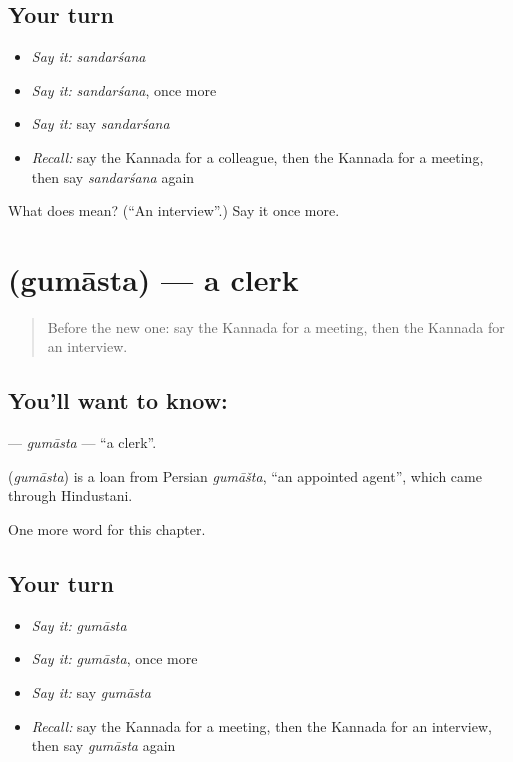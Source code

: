 \subsection*{Your turn}
\begin{itemize}
\raggedright
  \item \emph{Say it:} \emph{sandarśana}
  \item \emph{Say it:} \emph{sandarśana}, once more
  \item \emph{Say it:} say \emph{sandarśana}
  \item \emph{Recall:} say the Kannada for a colleague, then the Kannada for a meeting, then say \emph{sandarśana} again
\end{itemize}

\begin{tcolorbox}[breakable,colback=teal!4,colframe=teal!35!black,title={Before you move on}]
What does  mean? (\textquotedblleft{}An interview\textquotedblright{}.) Say it once more.
\end{tcolorbox}
\section[\texorpdfstring{\kn{ಗುಮಾಸ್ತ} (gumāsta)}{ಗುಮಾಸ್ತ (gumāsta)}]{ (gumāsta) — a clerk}

\label{lesson:KA-C231-gumasta}



\begin{quote}
Before the new one: say the Kannada for a meeting, then the Kannada for an interview.
\end{quote}

\subsection*{You'll want to know: }
\textbf{} — \emph{gumāsta} — \textquotedblleft{}a clerk\textquotedblright{}.

\begin{cousinweb}
\textbf{} (\emph{gumāsta}) is a loan from Persian \emph{gumāšta}, \textquotedblleft{}an appointed agent\textquotedblright{}, which came through Hindustani.
\end{cousinweb}

\begin{grammarlens}[title={What you've built}]
One more word for this chapter.
\end{grammarlens}

\subsection*{Your turn}
\begin{itemize}
\raggedright
  \item \emph{Say it:} \emph{gumāsta}
  \item \emph{Say it:} \emph{gumāsta}, once more
  \item \emph{Say it:} say \emph{gumāsta}
  \item \emph{Recall:} say the Kannada for a meeting, then the Kannada for an interview, then say \emph{gumāsta} again
\end{itemize}

